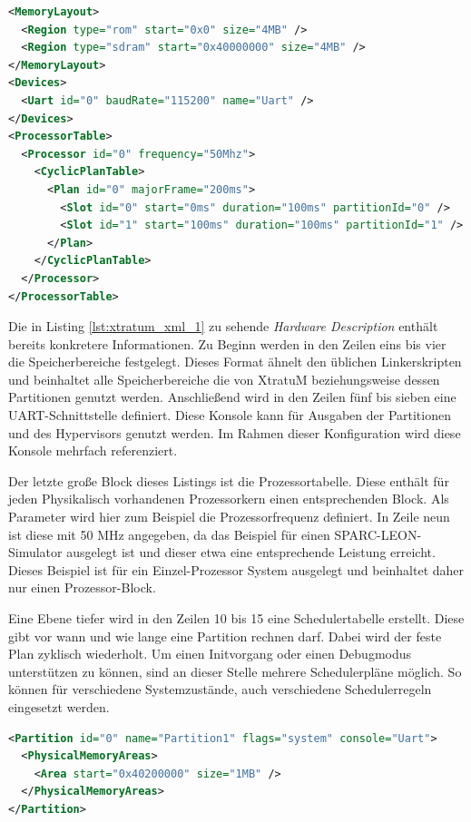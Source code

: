\documentclass[
  a4paper,					    %
  twoside,
  DIV=calc,     				%
  bibliography=totoc,
  cleardoublepage=empty,
  ngerman,     					%
  final       					%
]{scrbook}
\begin{document}
\begin{lstlisting}[frame=single, language=XML, basicstyle=\footnotesize, caption={XtratuM Hardware Description}, label={lst:xtratum_xml_1}]
<MemoryLayout>
  <Region type="rom" start="0x0" size="4MB" />
  <Region type="sdram" start="0x40000000" size="4MB" />
</MemoryLayout>
<Devices>
  <Uart id="0" baudRate="115200" name="Uart" />
</Devices>
<ProcessorTable>
  <Processor id="0" frequency="50Mhz">
    <CyclicPlanTable>
      <Plan id="0" majorFrame="200ms">
        <Slot id="0" start="0ms" duration="100ms" partitionId="0" />
        <Slot id="1" start="100ms" duration="100ms" partitionId="1" />
      </Plan>
    </CyclicPlanTable>
  </Processor>
</ProcessorTable>
\end{lstlisting}

Die in Listing \ref{lst:xtratum_xml_1} zu sehende \emph{Hardware Description} enthält bereits konkretere Informationen. Zu Beginn werden in den Zeilen eins bis vier die Speicherbereiche festgelegt. Dieses Format ähnelt den üblichen Linkerskripten und beinhaltet alle Speicherbereiche die von XtratuM beziehungsweise dessen Partitionen genutzt werden. Anschließend wird in den Zeilen fünf bis sieben eine UART-Schnittstelle definiert. Diese Konsole kann für Ausgaben der Partitionen und des Hypervisors genutzt werden. Im Rahmen dieser Konfiguration wird diese Konsole mehrfach referenziert.

Der letzte große Block dieses Listings ist die Prozessortabelle. Diese enthält für jeden Physikalisch vorhandenen Prozessorkern einen entsprechenden Block. Als Parameter wird hier zum Beispiel die Prozessorfrequenz definiert. In Zeile neun ist diese mit 50 MHz angegeben, da das Beispiel für einen SPARC-LEON-Simulator ausgelegt ist und dieser etwa eine entsprechende Leistung erreicht. Dieses Beispiel ist für ein Einzel-Prozessor System ausgelegt und beinhaltet daher nur einen Prozessor-Block.

Eine Ebene tiefer wird in den Zeilen 10 bis 15 eine Schedulertabelle erstellt. Diese gibt vor wann und wie lange eine Partition rechnen darf. Dabei wird der feste Plan zyklisch wiederholt. Um einen Initvorgang oder einen Debugmodus unterstützen zu können, sind an dieser Stelle mehrere Schedulerpläne möglich. So können für verschiedene Systemzustände, auch verschiedene Schedulerregeln eingesetzt werden.

\begin{lstlisting}[frame=single, language=XML, basicstyle=\footnotesize, caption={XtratuM Partition Table}, label={lst:xtratum_xml_2}]
<Partition id="0" name="Partition1" flags="system" console="Uart">
  <PhysicalMemoryAreas>
    <Area start="0x40200000" size="1MB" />
  </PhysicalMemoryAreas>
</Partition>
\end{lstlisting}
\end{document}
